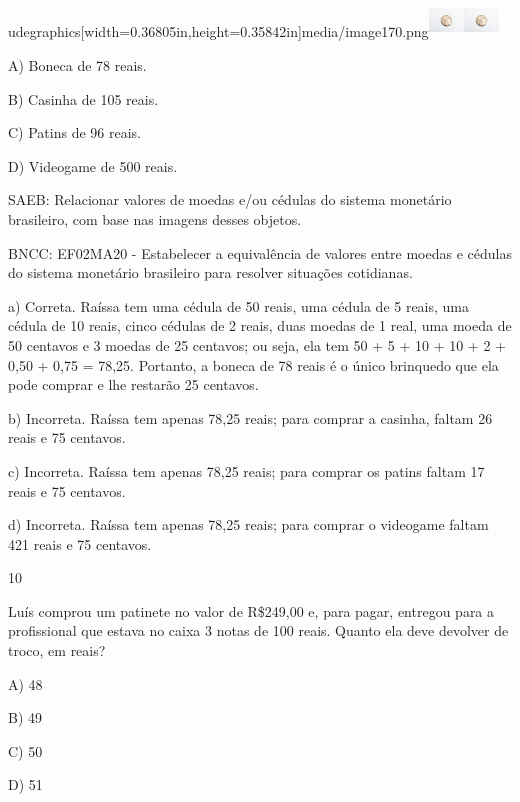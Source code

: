 \begin{escolha}
\begin{escolha}
{{{{{{{{udegraphics[width=0.36805in,height=0.35842in]{media/image170.png}\includegraphics[width=0.36805in,height=0.35842in]{media/image170.png}\includegraphics[width=0.36805in,height=0.35842in]{media/image170.png}

A) Boneca de 78 reais.

B) Casinha de 105 reais.

C) Patins de 96 reais.

D) Videogame de 500 reais.

SAEB: Relacionar valores de moedas e/ou cédulas do sistema
monetário brasileiro, com base nas imagens desses objetos.

BNCC: EF02MA20 - Estabelecer a equivalência de valores entre moedas e
cédulas do sistema monetário brasileiro para resolver situações
cotidianas.

a) Correta. Raíssa tem uma cédula de 50 reais, uma cédula de 5 reais,
uma cédula de 10 reais, cinco cédulas de 2 reais, duas moedas de 1 real,
uma moeda de 50 centavos e 3 moedas de 25 centavos; ou seja, ela tem 50
+ 5 + 10 + 10 + 2 + 0,50 + 0,75 = 78,25. Portanto, a boneca de 78 reais
é o único brinquedo que ela pode comprar e lhe restarão 25 centavos.

b) Incorreta. Raíssa tem apenas 78,25 reais; para comprar a casinha,
faltam 26 reais e 75 centavos.

c) Incorreta. Raíssa tem apenas 78,25 reais; para comprar os patins
faltam 17 reais e 75 centavos.

d) Incorreta. Raíssa tem apenas 78,25 reais; para comprar o videogame
faltam 421 reais e 75 centavos.

\num{10}

Luís comprou um patinete no valor de R\$249,00 e, para pagar, entregou
para a profissional que estava no caixa 3 notas de 100 reais. Quanto ela deve devolver de troco, em reais?

A) 48

B) 49

C) 50

D) 51

}}}}}}}}
\end{escolha}
\end{escolha}

